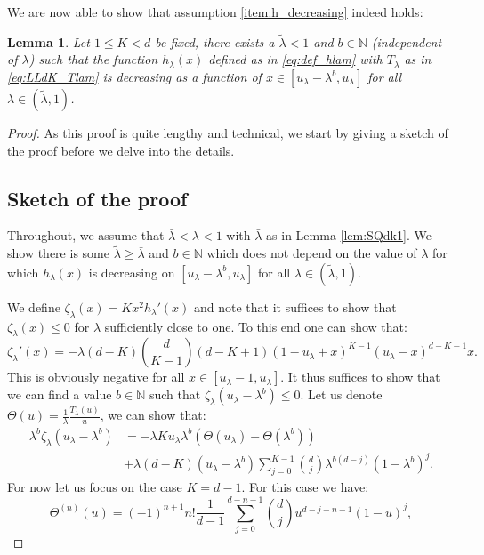 \documentclass[12pt]{report}
\newtheorem{lemma}[theorem]{Lemma}
\begin{document}
We are now able to show that assumption \ref{item:h_decreasing} indeed holds:

\begin{lemma}\label{lem:LLdk2}
Let $1\leq K < d$ be fixed, there exists a $\tilde \lambda< 1$ and $b \in \mathbb{N}$ (independent of $\lambda$) such that the function $h_{\lambda}(x)$ defined as in \eqref{eq:def_hlam} with $T_{\lambda}$ as in \eqref{eq:LLdK_Tlam} is decreasing as a function of $x\in[u_\lambda-\lambda^b,u_\lambda]$ for all $\lambda \in (\tilde \lambda,1)$.
\end{lemma}
\begin{proof}
As this proof is quite lengthy and technical, we start by giving a sketch of the proof before we delve into the details.
\subsection*{Sketch of the proof}
Throughout, we assume that $\bar \lambda < \lambda < 1$ with $\bar \lambda$ as in Lemma \ref{lem:SQdk1}. We show there is some $\tilde{\lambda} \geq \bar \lambda$ and $b \in \mathbb{N}$ which does not depend on the value of $\lambda$ for which $h_{\lambda}(x)$ is decreasing on $[u_\lambda - \lambda^b, u_{\lambda}]$ for all $\lambda \in (\tilde \lambda, 1)$.

We define $\zeta_\lambda(x)=Kx^2h_\lambda'(x)$ and note that it suffices to show that $\zeta_\lambda(x) \leq 0$ for $\lambda$ sufficiently close to one. To this end one can show that:
\begin{equation} \label{eq:DzetaLam_paper}
\zeta_\lambda'(x)=-\lambda (d-K) \binom{d}{K-1} (d-K+1) (1-u_\lambda+x)^{K-1} (u_\lambda-x)^{d-K-1} x.
\end{equation}
This is obviously negative for all $x \in [u_\lambda-1,u_\lambda]$. It thus suffices to show that we can find a value $b \in \mathbb{N}$ such that $\zeta_\lambda(u_\lambda-\lambda^b) \leq 0$.
Let us denote $\Theta(u) = \frac{1}{\lambda} \frac{T_\lambda(u)}{u}$, we can show that:
\begin{align}
\lambda^b \zeta_\lambda\left(u_\lambda-\lambda^b\right)
&= -\lambda K u_\lambda \lambda^b (\Theta(u_\lambda) - \Theta(\lambda^b))\\
& + \lambda (d-K) (u_\lambda - \lambda^b) \sum_{j=0}^{K-1} \binom{d}{j} \lambda^{b(d-j)} (1-\lambda^b)^j. \label{eq:lambzetaulamminlamb_paper}
\end{align}
For now let us focus on the case $K=d-1$. For this case we have:
\begin{equation}\label{eq:DnTheta_paper}
\Theta^{(n)}(u)=(-1)^{n+1} n! \frac{1}{d-1} \sum_{j=0}^{d-n-1} \binom{d}{j} u^{d-j-n-1} (1-u)^j,
\end{equation}


\end{proof}
\end{document}

